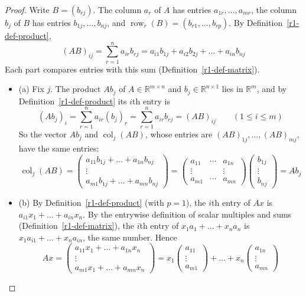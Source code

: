 \documentclass[12pt]{article}
\newcommand{\R}{\mathbb R}
\DeclareMathOperator{\row}{row}
\DeclareMathOperator{\col}{col}
\theoremstyle{definition}
\begin{document}
\begin{proof}
Write \(B=(b_{rj})\). The column \(a_r\) of \(A\) has entries
\(a_{1r},\dots,a_{mr}\), the column \(b_j\) of \(B\) has entries \(b_{1j},\dots,b_{nj}\), and
\(\row_r(B)=(b_{r1},\dots,b_{rp})\). By Definition~\ref{r1-def-product},
\[
(AB)_{ij}=\sum_{r=1}^n a_{ir}b_{rj}=a_{i1}b_{1j}+a_{i2}b_{2j}+\dots+a_{in}b_{nj}
\]
Each part compares entries with this sum (Definition~\ref{r1-def-matrix}).
\begin{itemize}
\item (a) Fix \(j\). The product \(Ab_j\) of \(A\in\R^{m\times n}\) and
\(b_j\in\R^{n\times1}\) lies in \(\R^m\), and by Definition~\ref{r1-def-product} its
\(i\)th entry is
\[
(Ab_j)_i=\sum_{r=1}^n a_{ir}(b_j)_r=\sum_{r=1}^n a_{ir}b_{rj}=(AB)_{ij}\qquad(1\leqslant i\leqslant m)
\]
So the vector \(Ab_j\) and \(\col_j(AB)\), whose entries are
\((AB)_{1j},\dots,(AB)_{mj}\), have the same entries:
\[
\col_j(AB)=\begin{pmatrix}a_{11}b_{1j}+\dots+a_{1n}b_{nj}\\\vdots\\a_{m1}b_{1j}+\dots+a_{mn}b_{nj}\end{pmatrix}
=\begin{pmatrix}a_{11}&\cdots&a_{1n}\\\vdots&&\vdots\\a_{m1}&\cdots&a_{mn}\end{pmatrix}
\begin{pmatrix}b_{1j}\\\vdots\\b_{nj}\end{pmatrix}=Ab_j
\]
\item (b) By Definition~\ref{r1-def-product} (with \(p=1\)), the \(i\)th entry of
\(Ax\) is \(a_{i1}x_1+\dots+a_{in}x_n\). By the entrywise definition of scalar multiples and
sums (Definition~\ref{r1-def-matrix}), the \(i\)th entry of \(x_1a_1+\dots+x_na_n\) is
\(x_1a_{i1}+\dots+x_na_{in}\), the same number. Hence
\[
Ax=\begin{pmatrix}a_{11}x_1+\dots+a_{1n}x_n\\\vdots\\a_{m1}x_1+\dots+a_{mn}x_n\end{pmatrix}
=x_1\begin{pmatrix}a_{11}\\\vdots\\a_{m1}\end{pmatrix}+\dots+x_n\begin{pmatrix}a_{1n}\\\vdots\\a_{mn}\end{pmatrix}
\]
\end{itemize}
\end{proof}
\end{document}
